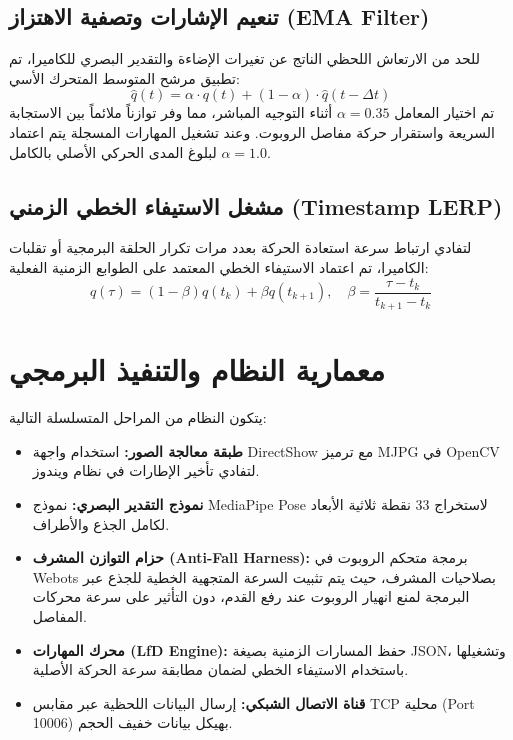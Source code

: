 \documentclass[11pt,a4paper]{article}
\begin{document}
\subsection{تنعيم الإشارات وتصفية الاهتزاز (EMA Filter)}
للحد من الارتعاش اللحظي الناتج عن تغيرات الإضاءة والتقدير البصري للكاميرا، تم تطبيق مرشح المتوسط المتحرك الأسي:
\begin{equation}
\hat{q}(t) = \alpha \cdot q(t) + (1 - \alpha) \cdot \hat{q}(t - \Delta t)
\end{equation}
تم اختيار المعامل $\alpha = 0.35$ أثناء التوجيه المباشر، مما وفر توازناً ملائماً بين الاستجابة السريعة واستقرار حركة مفاصل الروبوت. وعند تشغيل المهارات المسجلة يتم اعتماد $\alpha = 1.0$ لبلوغ المدى الحركي الأصلي بالكامل.

\subsection{مشغل الاستيفاء الخطي الزمني (Timestamp LERP)}
لتفادي ارتباط سرعة استعادة الحركة بعدد مرات تكرار الحلقة البرمجية أو تقلبات الكاميرا، تم اعتماد الاستيفاء الخطي المعتمد على الطوابع الزمنية الفعلية:
\begin{equation}
q(\tau) = (1 - \beta) q(t_k) + \beta q(t_{k+1}), \quad \beta = \frac{\tau - t_k}{t_{k+1} - t_k}
\end{equation}

\section{معمارية النظام والتنفيذ البرمجي}
يتكون النظام من المراحل المتسلسلة التالية:
\begin{itemize}
    \item \textbf{طبقة معالجة الصور:} استخدام واجهة DirectShow مع ترميز MJPG في OpenCV لتفادي تأخير الإطارات في نظام ويندوز.
    \item \textbf{نموذج التقدير البصري:} نموذج MediaPipe Pose لاستخراج 33 نقطة ثلاثية الأبعاد لكامل الجذع والأطراف.
    \item \textbf{حزام التوازن المشرف (Anti-Fall Harness):} برمجة متحكم الروبوت في Webots بصلاحيات المشرف، حيث يتم تثبيت السرعة المتجهية الخطية للجذع عبر البرمجة لمنع انهيار الروبوت عند رفع القدم، دون التأثير على سرعة محركات المفاصل.
    \item \textbf{محرك المهارات (LfD Engine):} حفظ المسارات الزمنية بصيغة JSON، وتشغيلها باستخدام الاستيفاء الخطي لضمان مطابقة سرعة الحركة الأصلية.
    \item \textbf{قناة الاتصال الشبكي:} إرسال البيانات اللحظية عبر مقابس TCP محلية (Port 10006) بهيكل بيانات خفيف الحجم.
\end{itemize}
\end{document}
